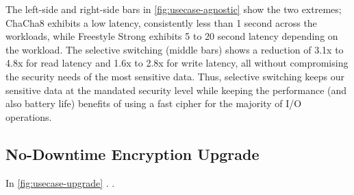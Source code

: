 

The left-side and right-side bars in \cref{fig:usecase-agnostic} show the two
extremes; ChaCha8 exhibits a low latency, consistently less than 1 second across
the workloads, while Freestyle Strong exhibits 5 to 20 second latency depending
on the workload. The selective switching (middle bars) shows a reduction of 3.1x
to 4.8x for read latency and 1.6x to 2.8x for write latency, all without
compromising the security needs of the most sensitive data. Thus, selective
switching keeps our sensitive data at the mandated security level while keeping
the performance (and also battery life) benefits of using a fast cipher for the
majority of I/O operations.


\subsection{No-Downtime Encryption Upgrade}\label{subsec:usecase-upgrade}



In \cref{fig:usecase-upgrade} . .
